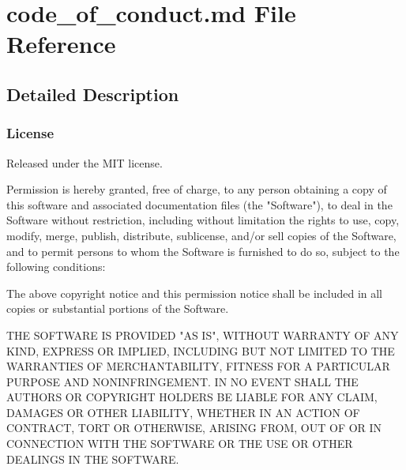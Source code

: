 \hypertarget{code__of__conduct_8md}{}\section{code\+\_\+of\+\_\+conduct.\+md File Reference}
\label{code__of__conduct_8md}


\subsection{Detailed Description}
\subsubsection*{License}

Released under the M\+I\+T license. \begin{DoxyVerb}Permission is hereby granted, free of charge, to any person obtaining a copy
of this software and associated documentation files (the "Software"), to deal
in the Software without restriction, including without limitation the rights
to use, copy, modify, merge, publish, distribute, sublicense, and/or sell
copies of the Software, and to permit persons to whom the Software is
furnished to do so, subject to the following conditions:

The above copyright notice and this permission notice shall be included in
all copies or substantial portions of the Software.

THE SOFTWARE IS PROVIDED "AS IS", WITHOUT WARRANTY OF ANY KIND, EXPRESS OR
IMPLIED, INCLUDING BUT NOT LIMITED TO THE WARRANTIES OF MERCHANTABILITY,
FITNESS FOR A PARTICULAR PURPOSE AND NONINFRINGEMENT. IN NO EVENT SHALL THE
AUTHORS OR COPYRIGHT HOLDERS BE LIABLE FOR ANY CLAIM, DAMAGES OR OTHER
LIABILITY, WHETHER IN AN ACTION OF CONTRACT, TORT OR OTHERWISE, ARISING FROM,
OUT OF OR IN CONNECTION WITH THE SOFTWARE OR THE USE OR OTHER DEALINGS IN
THE SOFTWARE. \end{DoxyVerb}
